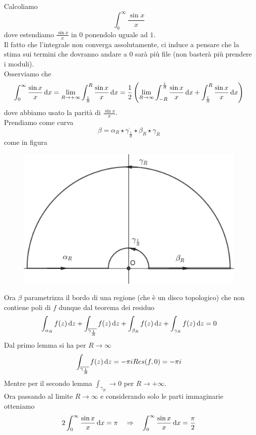 \begin{ese}Calcoliamo 
$$ \int_0^\infty \frac{\sin x}{x}$$
dove estendiamo $\frac{\sin x }{x}$ in $0$ ponendolo uguale ad $1$.\\
Il fatto che l'integrale non converga assolutamente, ci induce a pensare che la stima sui termini che dovranno andare a $0$ sar\`a pi\`u file (non baster\`a pi\`u prendere i moduli).\\
Osserviamo che $$\int_0^\infty \frac{\sin x}{x} \, \mathrm{d}x =\lim_{R \to +\infty} \int_{\frac{1}{R}}^R \frac{\sin x }{x} \, \mathrm{d}x =\frac{1}{2}\left( \lim_{R\to \infty} \int_{-R}^{\frac{1}{R}}\frac{\sin x }{x} \, \mathrm{d}x + \int_{\frac{1}{R}}^R \frac{\sin x}{x} \, \mathrm{d}x  \right) $$ dove abbiamo usato la parit\`a di $\frac{\sin x }{x}$.\\
Prendiamo come curva 
$$ \beta = \alpha_R \star \overline{\gamma_{\frac{1}{R}}} \star \beta_R \star \gamma_R$$ 
come in figura\\ 
\begin{figure}[!h]
\centering
\includegraphics[scale=0.4]{Figure/04_29_1}
\end{figure}

Ora $\beta$ parametrizza il bordo di una regione (che \`e un disco topologico) che non contiene poli di $f$ dunque dal teorema dei residuo
$$ \int_{\alpha_R} f(z)\, \mathrm{d}z + \int_{\overline{\gamma_{\frac{1}{R}}}} f(z) \, \mathrm{d}z  + \int_{\beta_R} f(z) \, \mathrm{d}z + \int_{\gamma_R} f(z) \, \mathrm{d}z =0$$ 
Dal primo lemma si ha per $R \to \infty$
$$ \int_{\overline{\gamma_{\frac{1}{R}}}} f(z) \, \mathrm{d}z = -\pi i Res (f,0) =-\pi i $$
Mentre per il secondo lemma $\int_{\gamma_R} \to 0$ per $R \to + \infty$.\\
Ora passando al limite $R \to \infty$ e considerando solo le parti immaginarie otteniamo 
$$ 2\int_0^\infty\frac{\sin x}{x} \, \mathrm{d}x = \pi \quad \Rightarrow\quad \int_0^\infty\frac{\sin x}{x} \, \mathrm{d}x = \frac{\pi}{2}$$
\end{ese}
\newpage
